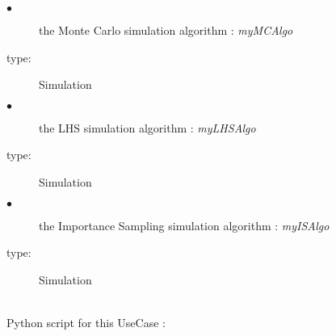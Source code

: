              {
               \begin{description}
               \item[$\bullet$] the Monte Carlo simulation algorithm : {\itshape myMCAlgo}
               \item[type:] Simulation
               \item[$\bullet$] the LHS simulation algorithm : {\itshape myLHSAlgo}
               \item[type:] Simulation
               \item[$\bullet$] the Importance Sampling simulation algorithm : {\itshape myISAlgo}
               \item[type:] Simulation
               \end{description}
             }

             \textspace\\
             Python  script for this UseCase :
